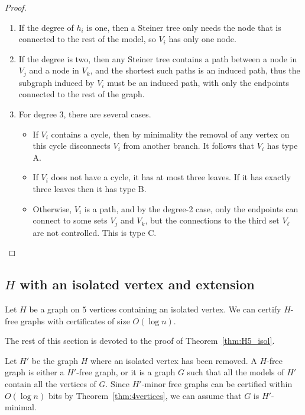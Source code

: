 \documentclass[a4paper,thm-restate,USenglish]{lipics-v2019}
\begin{document}
\begin{proof}
\begin{enumerate}
    \item If the degree of $h_i$ is one, then a Steiner tree only needs the node that is connected to the rest of the model, so $V_i$ has only one node.
    \item If the degree is two, then any Steiner tree contains a path between a node in $V_j$ and a node in $V_k$, and the shortest such paths is an induced path, thus the subgraph induced by $V_i$ must be an induced path, with only the endpoints connected to the rest of the graph.
    \item For degree 3, there are several cases. 
    \begin{itemize}
        \item If $V_i$ contains a cycle, then by minimality the removal of any vertex on this cycle disconnects $V_i$ from another branch. It follows that $V_i$ has type A.
        \item If $V_i$ does not have a cycle, it has at most three leaves. If it has exactly three leaves then it has type B.
        \item Otherwise, $V_i$ is a path, and by the degree-2 case, only the endpoints can connect to some sets $V_j$ and $V_k$, but the connections to the third set $V_{\ell}$ are not controlled. This is type C.
    \end{itemize}
\end{enumerate}
\end{proof}

\subsection{$H$ with an isolated vertex and extension}
\begin{theorem}
\label{thm:H5_isol}
Let $H$ be a graph on $5$ vertices containing an isolated vertex. We can certify $H$-free graphs with certificates of size $O(\log n)$.
\end{theorem}

The rest of this section is devoted to the proof of Theorem~\ref{thm:H5_isol}.

Let $H'$ be the graph $H$ where an isolated vertex has been removed. A $H$-free graph is either a $H'$-free graph, or it is a graph $G$ such that all the models of $H'$ contain all the vertices of $G$. Since $H'$-minor free graphs can be certified within $O(\log n)$ bits by Theorem~\ref{thm:4vertices}, we can assume that $G$ is $H'$-minimal. 
\end{document}
